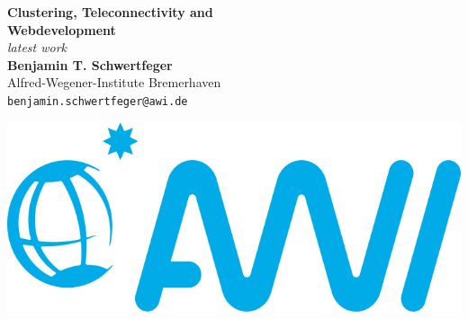\documentclass[a0,portrait]{a0poster}
\begin{document}


\begin{minipage}[b]{0.75\linewidth}
\VeryHuge \color{NavyBlue} \textbf{Clustering, Teleconnectivity and \\Webdevelopment} \color{Black}\\ %
\Huge\textit{latest work}\\[2.4cm] %
\huge \textbf{Benjamin T. Schwertfeger}\\[0.5cm] %
\huge Alfred-Wegener-Institute Bremerhaven\\[0.4cm] %
\Large \texttt{benjamin.schwertfeger@awi.de}
\end{minipage}
%
\begin{minipage}[b]{0.25\linewidth}
\includegraphics[width=14cm]{awilogo.png}\ 
\end{minipage}

\vspace{1cm} %

\end{document}
